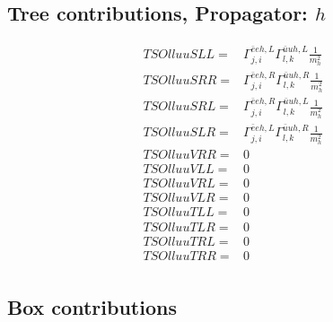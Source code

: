\documentclass[A4,landscape]{article}
\begin{document}
\subsection{Tree contributions, Propagator: $h$} 

\begin{align} 
  TSOlluuSLL= & \Gamma^{\bar{e}e h ,L}_{j, i} \Gamma^{\bar{u}u h ,L}_{l, k} \frac{1}{m^2_{h}} \\ 
  TSOlluuSRR= & \Gamma^{\bar{e}e h ,R}_{j, i} \Gamma^{\bar{u}u h ,R}_{l, k} \frac{1}{m^2_{h}} \\ 
  TSOlluuSRL= & \Gamma^{\bar{e}e h ,R}_{j, i} \Gamma^{\bar{u}u h ,L}_{l, k} \frac{1}{m^2_{h}} \\ 
  TSOlluuSLR= & \Gamma^{\bar{e}e h ,L}_{j, i} \Gamma^{\bar{u}u h ,R}_{l, k} \frac{1}{m^2_{h}} \\ 
  TSOlluuVRR= & 0 \\ 
  TSOlluuVLL= & 0 \\ 
  TSOlluuVRL= & 0 \\ 
  TSOlluuVLR= & 0 \\ 
  TSOlluuTLL= & 0 \\ 
  TSOlluuTLR= & 0 \\ 
  TSOlluuTRL= & 0 \\ 
  TSOlluuTRR= & 0 \\ 
\end{align} 
\subsection{Box contributions} 
\end{document}
